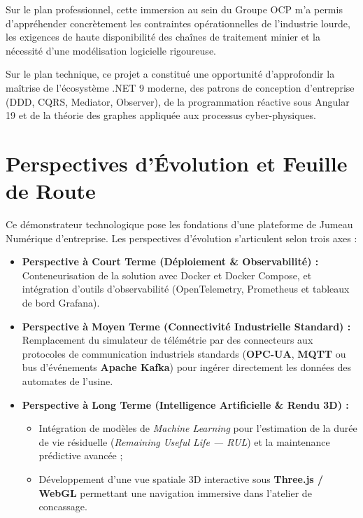 Sur le plan professionnel, cette immersion au sein du Groupe OCP m'a permis d'appréhender concrètement les contraintes opérationnelles de l'industrie lourde, les exigences de haute disponibilité des chaînes de traitement minier et la nécessité d'une modélisation logicielle rigoureuse.

Sur le plan technique, ce projet a constitué une opportunité d'approfondir la maîtrise de l'écosystème .NET 9 moderne, des patrons de conception d'entreprise (DDD, CQRS, Mediator, Observer), de la programmation réactive sous Angular 19 et de la théorie des graphes appliquée aux processus cyber-physiques.

\section{Perspectives d'Évolution et Feuille de Route}

Ce démonstrateur technologique pose les fondations d'une plateforme de Jumeau Numérique d'entreprise. Les perspectives d'évolution s'articulent selon trois axes :

\begin{itemize}
    \item \textbf{Perspective à Court Terme (Déploiement \& Observabilité) :} Conteneurisation de la solution avec Docker et Docker Compose, et intégration d'outils d'observabilité (OpenTelemetry, Prometheus et tableaux de bord Grafana).
    \item \textbf{Perspective à Moyen Terme (Connectivité Industrielle Standard) :} Remplacement du simulateur de télémétrie par des connecteurs aux protocoles de communication industriels standards (\textbf{OPC-UA}, \textbf{MQTT} ou bus d'événements \textbf{Apache Kafka}) pour ingérer directement les données des automates de l'usine.
    \item \textbf{Perspective à Long Terme (Intelligence Artificielle \& Rendu 3D) :}
    \begin{itemize}
        \item Intégration de modèles de \textit{Machine Learning} pour l'estimation de la durée de vie résiduelle (\textit{Remaining Useful Life --- RUL}) et la maintenance prédictive avancée ;
        \item Développement d'une vue spatiale 3D interactive sous \textbf{Three.js / WebGL} permettant une navigation immersive dans l'atelier de concassage.
    \end{itemize}
\end{itemize}
